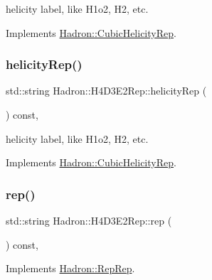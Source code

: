 helicity label, like H1o2, H2, etc. 

Implements \mbox{\hyperlink{structHadron_1_1CubicHelicityRep_af1096946b7470edf0a55451cc662f231}{Hadron\+::\+Cubic\+Helicity\+Rep}}.

\mbox{\label{structHadron_1_1H4D3E2Rep_a79e0c262ae365b9efabe080707d034a8}} 
\subsubsection{\texorpdfstring{helicityRep()}{helicityRep()}\hspace{0.1cm}{\footnotesize\ttfamily [3/3]}}
{\footnotesize\ttfamily std\+::string Hadron\+::\+H4\+D3\+E2\+Rep\+::helicity\+Rep (\begin{DoxyParamCaption}{ }\end{DoxyParamCaption}) const\hspace{0.3cm}{\ttfamily [inline]}, {\ttfamily [virtual]}}

helicity label, like H1o2, H2, etc. 

Implements \mbox{\hyperlink{structHadron_1_1CubicHelicityRep_af1096946b7470edf0a55451cc662f231}{Hadron\+::\+Cubic\+Helicity\+Rep}}.

\mbox{\label{structHadron_1_1H4D3E2Rep_a11d0a71e415f309565e9ca158248aa60}} 
\subsubsection{\texorpdfstring{rep()}{rep()}\hspace{0.1cm}{\footnotesize\ttfamily [1/5]}}
{\footnotesize\ttfamily std\+::string Hadron\+::\+H4\+D3\+E2\+Rep\+::rep (\begin{DoxyParamCaption}{ }\end{DoxyParamCaption}) const\hspace{0.3cm}{\ttfamily [inline]}, {\ttfamily [virtual]}}



Implements \mbox{\hyperlink{structHadron_1_1RepRep_ab3213025f6de249f7095892109575fde}{Hadron\+::\+Rep\+Rep}}.

\mbox{\label{structHadron_1_1H4D3E2Rep_a11d0a71e415f309565e9ca158248aa60}} 
